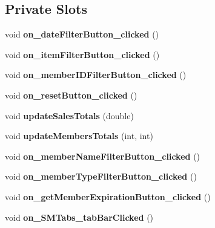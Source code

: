\subsection*{Private Slots}
\begin{DoxyCompactItemize}
\item 
\mbox{\label{class_store_manager_window_a0af20b335e6786faf6fe06256e36d078}} 
void {\bfseries on\+\_\+date\+Filter\+Button\+\_\+clicked} ()
\item 
\mbox{\label{class_store_manager_window_a8b8d309bd81f6483496efe0bb47ffbd1}} 
void {\bfseries on\+\_\+item\+Filter\+Button\+\_\+clicked} ()
\item 
\mbox{\label{class_store_manager_window_a2669aff9a68050538c6108df456fea04}} 
void {\bfseries on\+\_\+member\+I\+D\+Filter\+Button\+\_\+clicked} ()
\item 
\mbox{\label{class_store_manager_window_a240af52d868fbee234d1393013faab4e}} 
void {\bfseries on\+\_\+reset\+Button\+\_\+clicked} ()
\item 
\mbox{\label{class_store_manager_window_a66cec3c4d6e01c4d46469162c98d41da}} 
void {\bfseries update\+Sales\+Totals} (double)
\item 
\mbox{\label{class_store_manager_window_af0082133f3c26c25161d97df4974a6d7}} 
void {\bfseries update\+Members\+Totals} (int, int)
\item 
\mbox{\label{class_store_manager_window_a7ae72a66d5cc5b91756da56fb1ad125f}} 
void {\bfseries on\+\_\+member\+Name\+Filter\+Button\+\_\+clicked} ()
\item 
\mbox{\label{class_store_manager_window_aa60a20ed4cd24096edb0725b6a05d12a}} 
void {\bfseries on\+\_\+member\+Type\+Filter\+Button\+\_\+clicked} ()
\item 
\mbox{\label{class_store_manager_window_ac226d9cc5a03e7e604616f776b563939}} 
void {\bfseries on\+\_\+get\+Member\+Expiration\+Button\+\_\+clicked} ()
\item 
\mbox{\label{class_store_manager_window_abab04863192479294a897946a04241fa}} 
void {\bfseries on\+\_\+\+S\+M\+Tabs\+\_\+tab\+Bar\+Clicked} ()
\end{DoxyCompactItemize}

